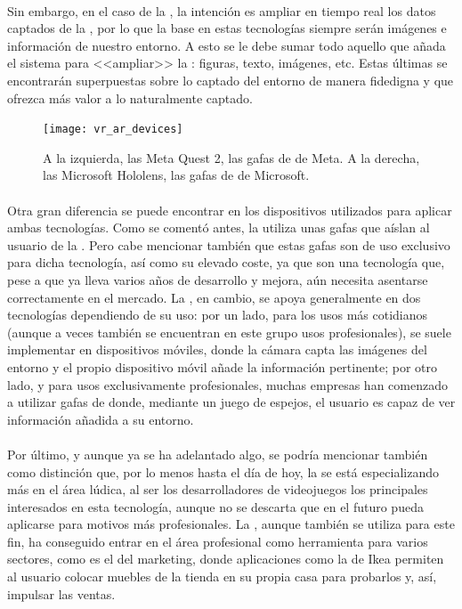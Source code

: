 \documentclass{subfiles}
\begin{document}
        \paragraph{}
        Sin embargo, en el caso de la \ra, la intención es ampliar en tiempo real los datos captados de la \realidad, por lo que la base en estas tecnologías siempre serán imágenes e información de nuestro entorno. A esto se le debe sumar todo aquello que añada el sistema para <<ampliar>> la \realidad: figuras, texto, imágenes, etc. Estas últimas se encontrarán superpuestas sobre lo captado del entorno de manera fidedigna y que ofrezca más valor a lo naturalmente captado.

        \begin{figure}
        \centering
        \texttt{[image: vr\_ar\_devices]}
        \caption{A la izquierda, las Meta Quest 2, las gafas de \rv de Meta. A la derecha, las Microsoft Hololens, las gafas de \ra de Microsoft.}
        \label{fig:vr_ar_devices}
        \end{figure}
    
        \paragraph{}
        Otra gran diferencia se puede encontrar en los dispositivos utilizados para aplicar ambas tecnologías. Como se comentó antes, la \rv utiliza unas gafas que aíslan al usuario de la \realidad. Pero cabe mencionar también que estas gafas son de uso exclusivo para dicha tecnología, así como su elevado coste, ya que son una tecnología que, pese a que ya lleva varios años de desarrollo y mejora, aún necesita asentarse correctamente en el mercado. La \ra, en cambio, se apoya generalmente en dos tecnologías dependiendo de su uso: por un lado, para los usos más cotidianos (aunque a veces también se encuentran en este grupo usos profesionales), se suele implementar en dispositivos móviles, donde la cámara capta las imágenes del entorno y el propio dispositivo móvil añade la información pertinente; por otro lado, y para usos exclusivamente profesionales, muchas empresas han comenzado a utilizar gafas de \ra donde, mediante un juego de espejos, el usuario es capaz de ver información añadida a su entorno.

        \paragraph{}
        Por último, y aunque ya se ha adelantado algo, se podría mencionar también como distinción que, por lo menos hasta el día de hoy, la \rv se está especializando más en el área lúdica, al ser los desarrolladores de videojuegos los principales interesados en esta tecnología, aunque no se descarta que en el futuro pueda aplicarse para motivos más profesionales. La \ra, aunque también se utiliza para este fin, ha conseguido entrar en el área profesional como herramienta para varios sectores, como es el del marketing, donde aplicaciones como la de Ikea permiten al usuario colocar muebles de la tienda en su propia casa para probarlos y, así, impulsar las ventas.
\end{document}
